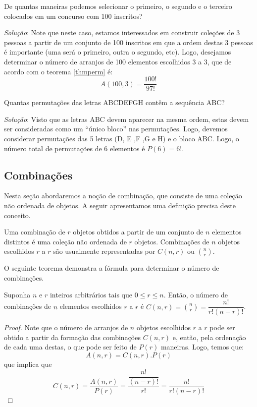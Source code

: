 \begin{Example}
De quantas maneiras podemos selecionar o primeiro, o segundo e o
terceiro colocados em um concurso com 100 inscritos?

\textit{Solução}: Note que neste caso, estamos interessados em
construir coleções de 3 pessoas a partir de um conjunto de 100
inscritos em que a ordem destas 3 pessoas é importante (uma será o
primeiro, outra o segundo, etc). Logo, desejamos determinar o número
de arranjos de 100 elementos escolhidos 3 a 3, que de acordo com o
teorema \ref{thmperm} é:
\[
A(100,3) = \dfrac{100!}{97!}
\]
\end{Example}

\begin{Example}
Quantas permutações das letras ABCDEFGH contêm a sequência ABC?

\textit{Solução}: Visto que as letras ABC devem aparecer na mesma
ordem, estas devem ser consideradas como um ``único bloco'' nas
permutações. Logo, devemos considerar permutações das 5 letras (D, E
,F ,G e H) e o bloco ABC. Logo, o número total de permutações de 6
elementos é $P(6) = 6!$.
\end{Example}

\subsection{Combinações}

Nesta seção abordaremos a noção de combinação, que consiste de uma
coleção não ordenada de objetos. A seguir apresentamos uma definição
precisa deste conceito.

\begin{Definition}[Combinação]
Uma combinação de $r$ objetos obtidos a partir de um conjunto de $n$
elementos distintos é uma coleção não ordenada de $r$
objetos. Combinações de $n$ objetos escolhidos $r$ a $r$ são
usualmente representadas por $C(n,r)$ ou $\binom{n}{r}$.
\end{Definition}

O seguinte teorema demonstra a fórmula para determinar o número de
combinações.

\begin{Theorem}\label{thmcomb}
Suponha $n$ e $r$ inteiros arbitrários tais que $0 \leq r \leq
n$. Então, o número de combinações de $n$ elementos escolhidos $r$ a
$r$ é $C(n,r) = \binom{n}{r} = \dfrac{n!}{r!(n- r)!}$.
\end{Theorem}
\begin{proof}
Note que o número de arranjos de $n$ objetos escolhidos $r$ a $r$ pode
ser obtido a partir da formação das combinações $C(n,r)$ e, então,
pela ordenação de cada uma destas, o que pode ser feito de $P(r)$
maneiras. Logo, temos que:
\[
A(n,r) = C(n,r).P(r)
\]
que implica que
\[
C(n,r) = \dfrac{A(n,r)}{P(r)} = \dfrac{\dfrac{n!}{(n-r)!}}{r!} =
\dfrac{n!}{r!(n - r)!}
\]
\end{proof}


